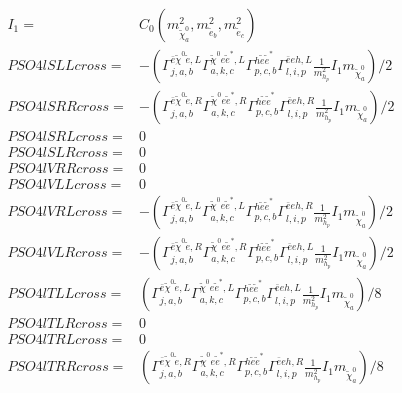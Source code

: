 \documentclass[A4,landscape]{article}
\begin{document}
\begin{align} 
I_1= & C_0(m^2_{\tilde{\chi}^0_{{a}}}, m^2_{\tilde{e}_{{b}}}, m^2_{\tilde{e}_{{c}}}) \\ 
  PSO4lSLLcross= & -( \Gamma^{\bar{e}\tilde{\chi}^0 \tilde{e} ,L}_{j, a, b} \Gamma^{\tilde{\chi}^0 e \tilde{e}^*,L}_{a, k, c} \Gamma^{h \tilde{e} \tilde{e}^*}_{p, c, b} \Gamma^{\bar{e}e h ,L}_{l, i, p} \frac{1}{m^2_{h_{{p}}}} I_1 m_{\tilde{\chi}^0_{{a}}})/2 \\ 
  PSO4lSRRcross= & -( \Gamma^{\bar{e}\tilde{\chi}^0 \tilde{e} ,R}_{j, a, b} \Gamma^{\tilde{\chi}^0 e \tilde{e}^*,R}_{a, k, c} \Gamma^{h \tilde{e} \tilde{e}^*}_{p, c, b} \Gamma^{\bar{e}e h ,R}_{l, i, p} \frac{1}{m^2_{h_{{p}}}} I_1 m_{\tilde{\chi}^0_{{a}}})/2 \\ 
  PSO4lSRLcross= & 0 \\ 
  PSO4lSLRcross= & 0 \\ 
  PSO4lVRRcross= & 0 \\ 
  PSO4lVLLcross= & 0 \\ 
  PSO4lVRLcross= & -( \Gamma^{\bar{e}\tilde{\chi}^0 \tilde{e} ,L}_{j, a, b} \Gamma^{\tilde{\chi}^0 e \tilde{e}^*,L}_{a, k, c} \Gamma^{h \tilde{e} \tilde{e}^*}_{p, c, b} \Gamma^{\bar{e}e h ,R}_{l, i, p} \frac{1}{m^2_{h_{{p}}}} I_1 m_{\tilde{\chi}^0_{{a}}})/2 \\ 
  PSO4lVLRcross= & -( \Gamma^{\bar{e}\tilde{\chi}^0 \tilde{e} ,R}_{j, a, b} \Gamma^{\tilde{\chi}^0 e \tilde{e}^*,R}_{a, k, c} \Gamma^{h \tilde{e} \tilde{e}^*}_{p, c, b} \Gamma^{\bar{e}e h ,L}_{l, i, p} \frac{1}{m^2_{h_{{p}}}} I_1 m_{\tilde{\chi}^0_{{a}}})/2 \\ 
  PSO4lTLLcross= & ( \Gamma^{\bar{e}\tilde{\chi}^0 \tilde{e} ,L}_{j, a, b} \Gamma^{\tilde{\chi}^0 e \tilde{e}^*,L}_{a, k, c} \Gamma^{h \tilde{e} \tilde{e}^*}_{p, c, b} \Gamma^{\bar{e}e h ,L}_{l, i, p} \frac{1}{m^2_{h_{{p}}}} I_1 m_{\tilde{\chi}^0_{{a}}})/8 \\ 
  PSO4lTLRcross= & 0 \\ 
  PSO4lTRLcross= & 0 \\ 
  PSO4lTRRcross= & ( \Gamma^{\bar{e}\tilde{\chi}^0 \tilde{e} ,R}_{j, a, b} \Gamma^{\tilde{\chi}^0 e \tilde{e}^*,R}_{a, k, c} \Gamma^{h \tilde{e} \tilde{e}^*}_{p, c, b} \Gamma^{\bar{e}e h ,R}_{l, i, p} \frac{1}{m^2_{h_{{p}}}} I_1 m_{\tilde{\chi}^0_{{a}}})/8 \\ 
\end{align} 
\end{document}
